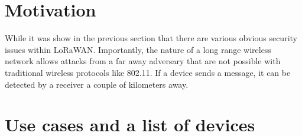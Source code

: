 \hypertarget{h.kyg6ihxrou88}{\section{\texorpdfstring{{Motivation}}{Motivation}}\label{h.kyg6ihxrou88}}

While it was show in the previous section that there are various
obvious security issues within LoRaWAN. Importantly, the nature of a long range
wireless network allows attacks from a far away adversary that are not
possible with traditional wireless protocols like 802.11. If a device
sends a message, it can be detected by a receiver a couple of kilometers away.

\section{Use cases and
a list of devices}\label{h.jsdk7si1wtbx}

